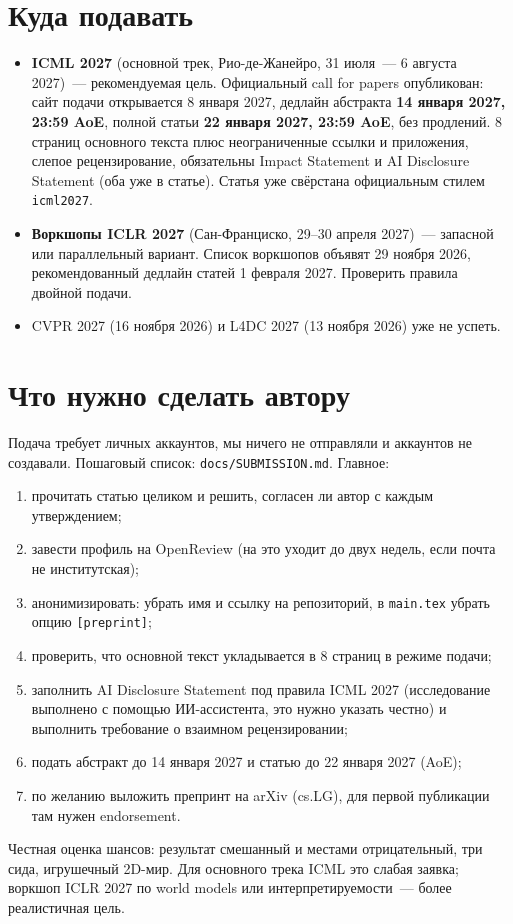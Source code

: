 \documentclass[11pt]{article}
\begin{document}
\section{Куда подавать}

\begin{itemize}
\item \textbf{ICML 2027} (основной трек, Рио-де-Жанейро, 31 июля~--- 6 августа 2027)~---
рекомендуемая цель. Официальный call for papers опубликован: сайт подачи открывается 8 января 2027,
дедлайн абстракта \textbf{14 января 2027, 23:59 AoE}, полной статьи \textbf{22 января 2027, 23:59
AoE}, без продлений. 8 страниц основного текста плюс неограниченные ссылки и приложения, слепое
рецензирование, обязательны Impact Statement и AI Disclosure Statement (оба уже в статье). Статья
уже свёрстана официальным стилем \texttt{icml2027}.
\item \textbf{Воркшопы ICLR 2027} (Сан-Франциско, 29--30 апреля 2027)~--- запасной или
параллельный вариант. Список воркшопов объявят 29 ноября 2026, рекомендованный дедлайн статей
1 февраля 2027. Проверить правила двойной подачи.
\item CVPR 2027 (16 ноября 2026) и L4DC 2027 (13 ноября 2026) уже не успеть.
\end{itemize}

\section{Что нужно сделать автору}

Подача требует личных аккаунтов, мы ничего не отправляли и аккаунтов не создавали. Пошаговый список:
\texttt{docs/SUBMISSION.md}. Главное:
\begin{enumerate}
\item прочитать статью целиком и решить, согласен ли автор с каждым утверждением;
\item завести профиль на OpenReview (на это уходит до двух недель, если почта не институтская);
\item анонимизировать: убрать имя и ссылку на репозиторий, в \texttt{main.tex} убрать опцию
\texttt{[preprint]};
\item проверить, что основной текст укладывается в 8 страниц в режиме подачи;
\item заполнить AI Disclosure Statement под правила ICML 2027 (исследование выполнено с помощью
ИИ-ассистента, это нужно указать честно) и выполнить требование о взаимном рецензировании;
\item подать абстракт до 14 января 2027 и статью до 22 января 2027 (AoE);
\item по желанию выложить препринт на arXiv (cs.LG), для первой публикации там нужен endorsement.
\end{enumerate}
Честная оценка шансов: результат смешанный и местами отрицательный, три сида, игрушечный 2D-мир.
Для основного трека ICML это слабая заявка; воркшоп ICLR 2027 по world models или
интерпретируемости~--- более реалистичная цель.
\end{document}
